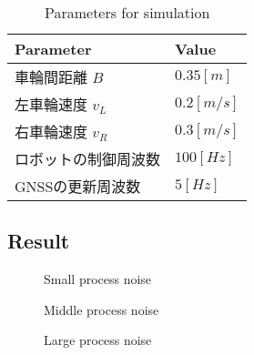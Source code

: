 \documentclass[a4paper]{article}
\begin{document}
\begin{table}[h]
    \caption{Parameters for simulation}
    \label{table:table1}
    \centering
    \begin{tabular}{ll}
        \hline
        Parameter & Value \\
        \hline \hline
        車輪間距離 \(B\) & \(0.35[m]\) \\
        左車輪速度 \(v_L\) & \(0.2 [m/s]\) \\
        右車輪速度 \(v_R\) & \(0.3 [m/s]\) \\
        ロボットの制御周波数 & \(100 [Hz]\) \\
        GNSSの更新周波数 & \(5 [Hz]\) \\
       \hline
    \end{tabular}
\end{table}


\subsection{Result}
%
%
%
\begin{figure}
\centerline{}
\caption{Small process noise}
\centerline{}
\caption{Middle process noise}
\centerline{}
\caption{Large process noise}
\end{figure}
\end{document}
